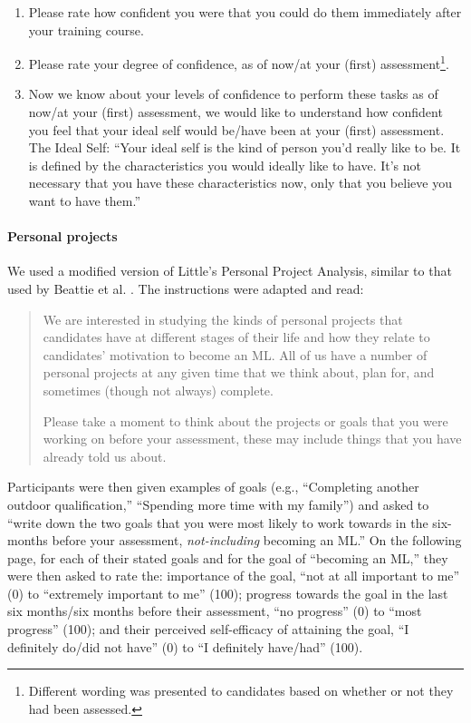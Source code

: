 \documentclass[a4paper,]{book}
\providecommand{\tightlist}{%
  \setlength{\itemsep}{0pt}\setlength{\parskip}{0pt}}
\let\oldparagraph\paragraph
\renewcommand{\paragraph}[1]{\oldparagraph{#1}\mbox{}}
\begin{document}
\begin{enumerate}
\def\labelenumi{\arabic{enumi})}
\tightlist
\item
  Please rate how confident you were that you could do them immediately after your training course.
\item
  Please rate your degree of confidence, as of now/at your (first) assessment\footnote{Different wording was presented to candidates based on whether or not they had been assessed.}.
\item
  Now we know about your levels of confidence to perform these tasks as of now/at your (first) assessment, we would like to understand how confident you feel that your ideal self would be/have been at your (first) assessment. The Ideal Self: ``Your ideal self is the kind of person you'd really like to be. It is defined by the characteristics you would ideally like to have. It's not necessary that you have these characteristics now, only that you believe you want to have them.''
\end{enumerate}

\hypertarget{personal-projects}{%
\paragraph{Personal projects}\label{personal-projects}}

We used a modified version of Little's \citeyearpar{Little1983} Personal Project Analysis, similar to that used by Beattie et al. \citeyearpar{Beattie2015}. The instructions were adapted and read:

\begin{quote}
We are interested in studying the kinds of personal projects that candidates have at different stages of their life and how they relate to candidates' motivation to become an ML. All of us have a number of personal projects at any given time that we think about, plan for, and sometimes (though not always) complete.

Please take a moment to think about the projects or goals that you were working on before your assessment, these may include things that you have already told us about.
\end{quote}

Participants were then given examples of goals (e.g., ``Completing another outdoor qualification,'' ``Spending more time with my family'') and asked to ``write down the two goals that you were most likely to work towards in the six-months before your assessment, \emph{not-including} becoming an ML.'' On the following page, for each of their stated goals and for the goal of ``becoming an ML,'' they were then asked to rate the: importance of the goal, ``not at all important to me'' (0) to ``extremely important to me'' (100); progress towards the goal in the last six months/six months before their assessment, ``no progress'' (0) to ``most progress'' (100); and their perceived self-efficacy of attaining the goal, ``I definitely do/did not have'' (0) to ``I definitely have/had'' (100).
\end{document}
